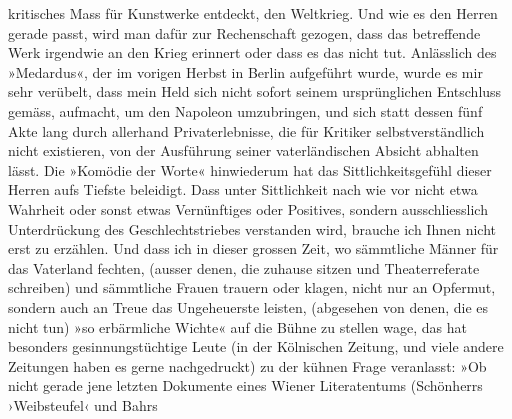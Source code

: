 \begin{ledgroupsized}[t]{13cm}
               kritisches Mass für Kunstwerke entdeckt,  den
               Weltkrieg. Und wie es den Herren gerade passt, wird man dafür zur Rechenschaft
               gezogen, dass das betreffende Werk irgendwie an den Krieg erinnert oder dass es das
               nicht tut. Anlässlich des »Medardus«, der im
               vorigen Herbst in Berlin aufgeführt wurde, wurde
               es mir sehr verübelt, dass mein Held sich nicht sofort seinem ursprünglichen
               Entschluss gemäss, aufmacht, um den Napoleon
               umzubringen, und sich statt dessen fünf Akte lang durch allerhand Privaterlebnisse,
               die für Kritiker selbstverständlich {\pb}nicht
               existieren, von der Ausführung seiner vaterländischen Absicht abhalten lässt. Die
                  »Komödie der Worte« hinwiederum hat das
               Sittlichkeitsgefühl dieser Herren aufs Tiefste beleidigt. Dass unter Sittlichkeit
               nach wie vor nicht etwa Wahrheit oder sonst etwas Vernünftiges oder Positives,
               sondern ausschliesslich Unterdrückung des Geschlechtstrieb\introOben{}e\introOben{}s
               verstanden wird, brauche ich Ihnen nicht erst zu erzählen. Und dass ich in dieser
               grossen Zeit, wo sämmtliche Männer für das Vaterland fechten, (ausser denen, die
               zuhause sitzen und Theaterreferate schreiben) und sämmtliche Frauen trauern oder
               klagen, nicht nur an Opfermut, sondern auch an Treue das Ungeheuerste leisten,
               (abgesehen von denen, die es nicht tun) »so erbärmliche Wichte« auf die Bühne zu
               stellen wage, das hat besonders gesinnungstüchtige Leute (in der Kölnischen Zeitung, und viele andere Zeitungen haben es gerne
               nachgedruckt) zu der kühnen Frage veranlasst: »Ob nicht gerade jene letzten Dokumente eines Wiener Literatentums (Schön{\pb}herrs ›Weibsteufel‹ und Bahrs

\end{ledgroupsized}
